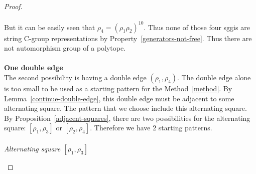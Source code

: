 \begin{proof}
\begin{figure}[H]
\begin{center}
\begin{tikzpicture}[scale=.8]
    \end{tikzpicture}
    \caption{}
    \label{proof-5-11}
  \end{center}
\end{figure}

\paragraph{}
But it can be easily seen that $\rho_4 = (\rho_1 \rho_2)^{10}$. Thus none of those four sggis are string C-group representations by Property~\ref{generators-not-free}. Thus there are not automorphism group of a polytope.

\paragraph{}
\textbf{One double edge}\\
The second possibility is having a double edge $(\rho_1, \rho_4)$. The double edge alone is too small to be used as a starting pattern for the Method~\ref{method}. By Lemma~\ref{continue-double-edge}, this double edge must be adjacent to some alternating square. The pattern that we choose include this alternating square. By Proposition~\ref{adjacent-squares}, there are two possibilities for the alternating square: $[\rho_1, \rho_3]$ or $[\rho_2, \rho_4]$. Therefore we have 2 starting patterns.

\paragraph{}
\textit{Alternating square $[\rho_1, \rho_3]$}

\begin{figure}[H]
  \begin{center}
\end{center}
\end{figure}
\end{proof}
